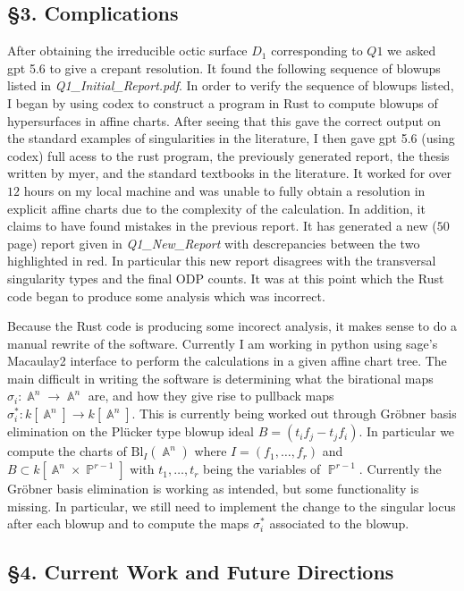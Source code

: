 \documentclass{article}
\DeclareMathOperator{\A}{\mathbb{A}}
\DeclareMathOperator{\PP}{\mathbb{P}}
\begin{document}
\subsection*{\S 3. Complications}

After obtaining the irreducible octic surface $D_1$ corresponding to $Q1$ we asked gpt 5.6 to give a crepant resolution. It found the following sequence of blowups listed in \textit{Q1\_Initial\_Report.pdf}. In order to verify the sequence of blowups listed, I began by using codex to construct a program in Rust to compute blowups of hypersurfaces in affine charts. After seeing that this gave the correct output on the standard examples of singularities in the literature, I then gave gpt 5.6 (using codex) full acess to the rust program, the previously generated report, the thesis written by myer, and the standard textbooks in the literature. It worked for over $12$ hours on my local machine and was unable to fully obtain a resolution in explicit affine charts due to the complexity of the calculation. In addition, it claims to have found mistakes in the previous report. It has generated a new ($50$ page) report given in \textit{Q1\_New\_Report} with descrepancies between the two highlighted in red. In particular this new report disagrees with the transversal singularity types and the final ODP counts. It was at this point which the Rust code began to produce some analysis which was incorrect. 

Because the Rust code is producing some incorect analysis, it makes sense to do a manual rewrite of the software. Currently I am working in python using sage's Macaulay2 interface to perform the calculations in a given affine chart tree. The main difficult in writing the software is determining what the birational maps $\sigma_i : \A^n \to \A^n$ are, and how they give rise to pullback maps $\sigma_i^* : k[\A^n]  \to k[\A^n]$. This is currently being worked out through Gr\"{o}bner basis elimination on the Pl\"{u}cker type blowup ideal $B = (t_i f_j - t_j f_i)$. In particular we compute the charts of $\text{Bl}_I(\A^n)$ where $I = (f_1,\dots,f_r)$ and $B \subset k[\A^n \times \PP^{r - 1}]$ with $t_1,\dots,t_{r}$ being the variables of $\PP^{r - 1}$. Currently the Gr\"{o}bner basis elimination is working as intended, but some functionality is missing. In particular, we still need to implement the change to the singular locus after each blowup and to compute the maps $\sigma_i^*$ associated to the blowup.

\subsection*{\S 4. Current Work and Future Directions}
\end{document}
